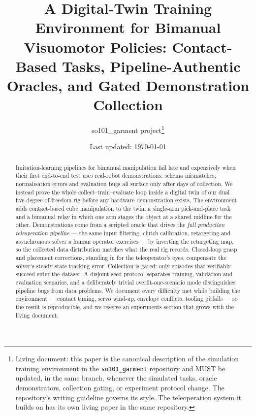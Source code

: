 \documentclass[10pt]{article}
\title{A Digital-Twin Training Environment for Bimanual
Visuomotor Policies: Contact-Based Tasks, Pipeline-Authentic Oracles,
and Gated Demonstration Collection}
\author{so101\_garment project\thanks{Living document: this paper is the
canonical description of the simulation training environment in the
\texttt{so101\_garment} repository and MUST be updated, in the same
branch, whenever the simulated tasks, oracle demonstrators, collection
gating, or experiment protocol change. The repository's writing
guideline governs its style. The teleoperation system it builds on has
its own living paper in the same repository.}}
\date{Last updated: \today}
\begin{document}
\maketitle

\begin{abstract}
Imitation-learning pipelines for bimanual manipulation fail late and
expensively when their first end-to-end test uses real-robot
demonstrations: schema mismatches, normalisation errors and evaluation
bugs all surface only after days of collection. We instead prove the
whole collect--train--evaluate loop inside a digital twin of our dual
five-degree-of-freedom rig before any hardware demonstration exists. The
environment adds contact-based cube manipulation to the twin: a
single-arm pick-and-place task and a bimanual relay in which one arm
stages the object at a shared midline for the other. Demonstrations come
from a scripted oracle that drives the \emph{full production
teleoperation pipeline} --- the same input filtering, clutch
calibration, retargeting and asynchronous solver a human operator
exercises --- by inverting the retargeting map, so the collected data
distribution matches what the real rig records. Closed-loop grasp and
placement corrections, standing in for the teleoperator's eyes,
compensate the solver's steady-state tracking error. Collection is
gated: only episodes that verifiably succeed enter the dataset. A
disjoint seed protocol separates training, validation and evaluation
scenarios, and a deliberately trivial overfit-one-scenario mode
distinguishes pipeline bugs from data problems. We document every
difficulty met while building the environment --- contact tuning,
servo wind-up, envelope conflicts, tooling pitfalls --- so the result is
reproducible, and we reserve an experiments section that grows with the
living document.
\end{abstract}











\end{document}
